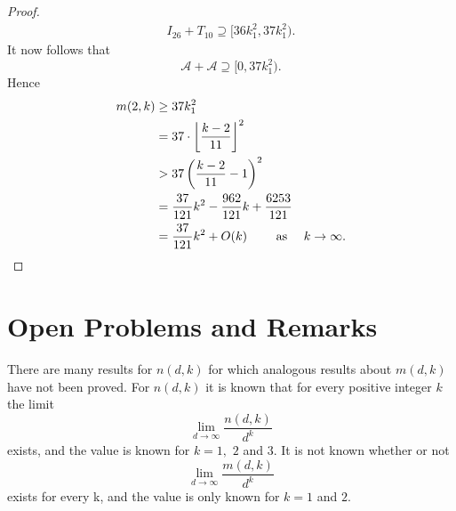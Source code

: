\documentclass[11pt]{article}
\theoremstyle{definition}
\begin{document}
\begin{proof}
\begin{align*}
I_{26} + T_{10}  \supseteq [36k_1^2, 37k_1^2).
\end{align*}
It now follows that 
\[
\mathcal{A} + \mathcal{A} \supseteq [0, 37k_1^2).
\]
Hence
\begin{align*}
m(2,k) &\geq 37k_1^2\\
&= 37 \cdot \left \lfloor \frac{k - 2}{11}\right \rfloor^2\\
&> 37 \left(\frac{k - 2}{11} -1\right) ^2\\
&= \frac{37}{121}k^2-\frac{962}{121}k+\frac{6253}{121}\\
&= \frac{37}{121}k^2 + O(k)\qquad \text{ as }\quad k \to \infty. \qedhere
\end{align*}
\end{proof}
\section{Open Problems and Remarks}
There are many results for $n(d,k)$ for which analogous results about $m(d,k)$ have not been proved.
For $n(d,k)$ it is known that for every positive integer $k$ the limit 
\[
\lim_{d \to \infty}{\frac{n(d,k)}{d^k}}
\]
exists, and the value is known for $k = 1,$ $2$ and $3$.  It is not known whether or not 
\[
\lim_{d \to \infty}{\frac{m(d,k)}{d^k}}
\]
exists for every k, and the value is only known for $k = 1$ and $2$.  
\newpage
	
		
\end{document}
